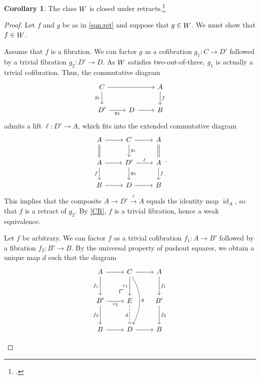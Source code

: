 \documentclass[10pt,letterpaper,cm]{nupset}
\theoremstyle{definition}
\theoremstyle{theorem}
\newtheorem{corollary}[definition]{Corollary}
\theoremstyle{remark}
\newcommand{\0}{\mathbf{0}}
\newcommand{\1}{\mathbf{1}}
\newcommand{\2}{\mathbf{2}}
\DeclareMathOperator{\idd}{id}
\DeclareMathOperator{\we}{\mathnormal{W}}
\begin{document}
\begin{corollary}
The class $\we$ is closed under retracts.\footnote{\cite[Lemma 2.4]{Riehl2}.}
\end{corollary}
\begin{proof}
 Let $f$ and $g$ be as in \eqref{eqn:ret} and suppose that $g\in \we$. We must show that $f\in \we$. 
 
 \begin{steps}
 \item Assume that $f$  is a fibration. We can factor $g$ as a cofibration $g_1 : C \to D'$ followed by a trivial fibration $g_2: D' \to D$. As $\we$ satisfies two-out-of-three, $g_1$ is actually a trivial cofibration. Thus, the commutative diagram
 \[
\begin{tikzcd}
C \arrow[d, "g_1"'] \arrow[rr] &             & A \arrow[d, "f"] \\
D' \arrow[r, "g_2"']           & D \arrow[r] & B               
\end{tikzcd}
 \]
 admits a lift $\ell : D' \to A$, which fits into the extended commutative diagram
 \[
\begin{tikzcd}
A \arrow[d, equals] \arrow[r]       & C \arrow[d, "g_1"] \arrow[r]          & A \arrow[d, equals]      \\
A \arrow[d, "f"'] \arrow[r] & D' \arrow[d, "g_2"] \arrow[r, "\ell"] & A \arrow[d, "f"] \\
B \arrow[r]                 & D \arrow[r]                           & B               
\end{tikzcd}
 .\] This implies that the composite $A \longrightarrow D' \overset{\ell}{\longrightarrow} A$ equals the identity map $\idd_A$, so that $f$ is a retract of $g_2$. By \cref{CR}, $f$ is a trivial fibration, hence a weak equivalence.
 \item Let $f$ be arbitrary. We can factor $f$ as a trivial cofibration $f_1 : A \to B'$ followed by a fibration $f_2: B' \to B$. By the universal property of pushout squares, we obtain a unique map $d$ such that the diagram
 \[ \label{eqn:pb1}
\begin{tikzcd}[row sep=large]
A \arrow[d, "f_1"'] \arrow[r]   
 \arrow[dr, phantom, "\scalebox{1.5}{\color{black}$\ulcorner$}", very near end, color=black]
        & C \arrow[d, "c_1"'] \arrow[r] \arrow[dd, "g", bend left] & A \arrow[d, "f_1"]  \\
B' \arrow[d, "f_2"'] \arrow[r, "c_2"'] & E \arrow[d, "d"', dashed]                                & B' \arrow[d, "f_2"] \\
B \arrow[r]                            & D \arrow[r]                                              & B                  

\end{tikzcd}\]
\end{steps}
\end{proof}
\end{document}
